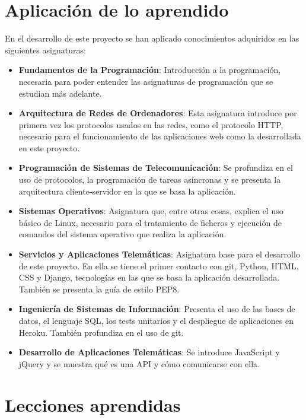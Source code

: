 \documentclass[a4paper, 12pt]{book}
\begin{document}
\section{Aplicación de lo aprendido}
\label{sec:aplicacion}

En el desarrollo de este proyecto se han aplicado conocimientos adquiridos en las siguientes asignaturas:

\begin{itemize}
  \item \textbf{Fundamentos de la Programación}: Introducción a la programación, necesaria para poder entender las asignaturas de programación que se estudian más adelante.
  \item \textbf{Arquitectura de Redes de Ordenadores}: Esta asignatura introduce por primera vez los protocolos usados en las redes, como el protocolo HTTP, necesario para el funcionamiento de las aplicaciones web como la desarrollada en este proyecto.
  \item \textbf{Programación de Sistemas de Telecomunicación}: Se profundiza en el uso de protocolos, la programación de tareas asíncronas y se presenta la arquitectura cliente-servidor en la que se basa la aplicación.
  \item \textbf{Sistemas Operativos}: Asignatura que, entre otras cosas, explica el uso básico de Linux, necesario para el tratamiento de ficheros y ejecución de comandos del sistema operativo que realiza la aplicación.
  \item \textbf{Servicios y Aplicaciones Telemáticas}: Asignatura base para el desarrollo de este proyecto. En ella se tiene el primer contacto con git, Python, HTML, CSS y Django, tecnologías en las que se basa la aplicación desarrollada. También se presenta la guía de estilo PEP8.
  \item \textbf{Ingeniería de Sistemas de Información}: Presenta el uso de las bases de datos, el lenguaje SQL, los tests unitarios y el despliegue de aplicaciones en Heroku. También profundiza en el uso de git.
  \item \textbf{Desarrollo de Aplicaciones Telemáticas}: Se introduce JavaScript y jQuery y se muestra qué es una API y cómo comunicarse con ella.
\end{itemize}

\section{Lecciones aprendidas}
\label{sec:lecciones_aprendidas}
\end{document}
